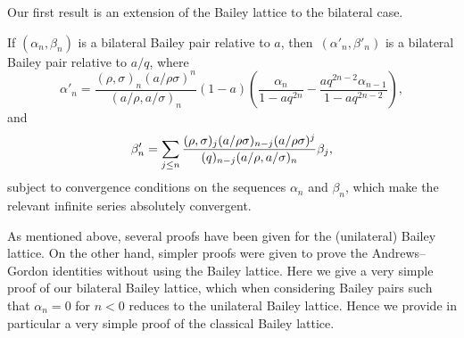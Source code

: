 Our first result is an extension of the Bailey lattice to the bilateral case.

\begin{Theorem}\label{thm:bilatbaileylattice}
If $(\alpha_n, \beta_n)$ is a bilateral Bailey pair relative to $a$, then~$(\alpha'_n, \beta'_n)$ is a bilateral Bailey pair relative to $a/q$, where
\begin{equation*}\alpha'_n=\frac{(\rho,\sigma)_n(a/\rho\sigma)^n}{(a/\rho,a/\sigma)_n}(1-a)\left(\frac{\alpha_n}{1-aq^{2n}}-\frac{aq^{2n-2}\alpha_{n-1}}{1-aq^{2n-2}}\right),
\end{equation*}
and
\begin{equation*}\beta'_n=\sum_{j\leq n}{(\rho,\sigma)_j(a/\rho\sigma)_{n-j}(a/\rho\sigma)^j\over (q)_{n-j}(a/\rho,a/\sigma)_n} \beta_j,
\end{equation*}
subject to convergence conditions on the sequences $\alpha_n$ and $\beta_n$, which make the relevant infinite series absolutely convergent.
\end{Theorem}

As mentioned above, several proofs have been given for the (unilateral) Bailey lattice. On the other hand, simpler proofs were given to prove the Andrews--Gordon identities without using the Bailey lattice. Here we give a very simple proof of our bilateral Bailey lattice, which when considering Bailey pairs such that $\alpha_n=0$ for $n<0$ reduces to the unilateral Bailey lattice. Hence we provide in particular a very simple proof of the classical Bailey lattice.

